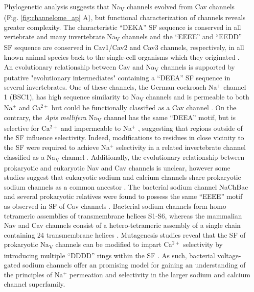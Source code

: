 \begin{refsection}
Phylogenetic analysis suggests that Na\textsubscript{V} channels evolved from Cav channels \cite{Hille:1989vz,Hille:2001tw,Yu:2004ep,Liebeskind:2011dn,GurBarzilai:2012kh} (Fig. \ref{fig:channelome_ap} A), but functional characterization of channels reveals greater complexity. The characteristic ``DEKA'' SF sequence is conserved in all vertebrate and many invertebrate Na\textsubscript{V} channels \cite{Widmark:2010in} and the ``EEEE'' and ``EEDD'' SF sequence are conserved in Cav1/Cav2 and Cav3 channels, respectively, in all known animal species back to the single-cell organisms which they originated \cite{Stephens:2015iv}. An evolutionary relationship between Cav and Na\textsubscript{V} channels is supported by putative "evolutionary intermediates" containing a ``DEEA'' SF sequence in several invertebrates. One of these channels, the German cockroach Na$^+$ channel 1 (BSC1), has high sequence similarity to Na\textsubscript{V} channels and is permeable to both Na$^+$ and Ca$^{2+}$ but could be functionally classified as a Cav channel \cite{Zhou:2004tc}. On the contrary, the \emph{Apis mellifera} Na\textsubscript{V} channel has the same ``DEEA'' motif, but is selective for Ca$^{2+}$ and impermeable to Na$^+$ \cite{GosselinBadaroudine:2016gw}, suggesting that regions outside of the SF influence selectivity. Indeed, modifications to residues in close vicinity to the SF were required to achieve Na$^+$ selectivity in a related invertebrate channel classified as a Na\textsubscript{V} channel \cite{GurBarzilai:2012kh}. Additionally, the evolutionary relationship between prokaryotic and eukaryotic Nav and Cav channels is unclear, however some studies suggest that eukaryotic sodium and calcium channels share prokaryotic sodium channels as a common ancestor \cite{Ren:2001uo,Yu:2004ep,Koishi:2004hy,Catterall:2015dh,Charalambous:2011dc}. The bacterial sodium channel NaChBac and several prokaryotic relatives were found to possess the same ``EEEE'' motif as observed in SF of Cav channels \cite{Ren:2001uo}. Bacterial sodium channels form homo-tetrameric assemblies of transmembrane helices S1-S6, whereas the mammalian Nav and Cav channels consist of a hetero-tetrameric assembly of a single chain containing 24 transmembrane helices \cite{Guy:1986bl,Ren:2001uo,Koishi:2004hy}. Mutagenesis studies reveal that the SF of prokaryotic Na\textsubscript{V} channels can be modified to impart Ca$^{2+}$ selectivity by introducing multiple ``DDDD'' rings within the SF \cite{Tang:2014cn,Shaya:2011ih,Yue:2002ee}. As such, bacterial voltage-gated sodium channels offer an promising model for gaining an understanding of the principles of Na$^+$ permeation and selectivity in the larger sodium and calcium channel superfamily.


\end{refsection}
